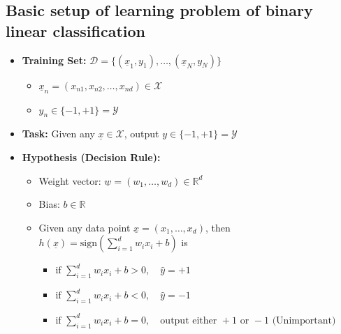 \subsection{Basic setup of learning problem of binary linear classification}
\begin{definition}
    \begin{itemize}
        \item \textbf{Training Set:} $\mathcal{D} = \{(\underline{x}_1, y_1), \dots, (\underline{x}_N, y_N)\}$
        \begin{itemize}
            \item $\underline{x}_n = (x_{n1}, x_{n2}, \dots, x_{nd}) \in \mathcal{X}$
            \item $y_n \in \{-1, +1\} = \mathcal{Y}$
        \end{itemize}
        \item \textbf{Task:} Given any $\underline{x} \in \mathcal{X}$, output $y \in \{-1, +1\} = \mathcal{Y}$
    
        \item \textbf{Hypothesis (Decision Rule):} 
        \begin{itemize}
            \item Weight vector: $\underline{w} = (w_1, \dots, w_d) \in \mathbb{R}^d$ 
            \item Bias: $b \in \mathbb{R}$
            \item Given any data point $\underline{x} = (x_1, \dots, x_d)$, then $h(\underline{x}) = \text{sign}\left(\sum_{i=1}^{d} w_i x_i + b\right)$ is 
            \begin{itemize}
                \item $\text{if } \sum_{i=1}^{d} w_i x_i + b > 0, \quad \hat{y} = +1$
                \item $\text{if } \sum_{i=1}^{d} w_i x_i + b < 0, \quad \hat{y} = -1$
                \item $\text{if } \sum_{i=1}^{d} w_i x_i + b = 0, \quad \text{output either } +1 \text{ or } -1 \text{ (Unimportant)}$
            \end{itemize}
        \end{itemize}
    \end{itemize}        
\end{definition}


